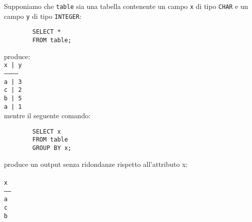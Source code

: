 \documentclass[12pt,a4paper]{book}
\begin{document}
	\begin{tcolorbox}[enhanced jigsaw, breakable,title=Esempio, title filled]
		Supponiamo che \texttt{table} sia una tabella contenente un campo \texttt{x} di tipo \texttt{CHAR} e un campo \texttt{y} di tipo \texttt{INTEGER}:
		\begin{lstlisting}
		SELECT *
		FROM table;
		\end{lstlisting}
		produce:\vspace{10px}\\
		\texttt{x  |  y\\-----------\\a  |  3\\c  |  2\\b  |  5\\a  |  1}\vspace{10px}\\
		mentre il seguente comando:
		\begin{lstlisting}
		SELECT x
		FROM table
		GROUP BY x;
		\end{lstlisting}
		produce un output senza ridondanze rispetto all'attributo x:\vspace{10px}\\ \\
		\texttt{x \\-----\\a\\c\\b}
	\end{tcolorbox}
\end{document}
